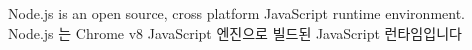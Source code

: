 Node.js is an open
source, cross platform JavaScript runtime environment.
Node.js
는 Chrome v8 JavaScript 엔진으로 빌드된 JavaScript 런타임입니다